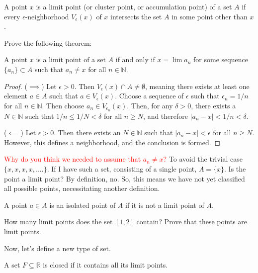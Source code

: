 \documentclass{ximera}
\begin{document}
\begin{definition}
    A point $x$ is a limit point (or cluster point, or accumulation point) of a set $A$ if every $\epsilon$-neighborhood $V_\epsilon(x)$ of $x$ intersects the set $A$ in some point other than $x$.  
\end{definition}
\begin{exercise}
    Prove the following theorem:
\begin{theorem}
    A point $x$ is a limit point of a set $A$ if and only if $x = \lim a_n$ for some sequence $\{a_n\}\subset A$ such that $a_n \neq x$ for all $n \in \mathbb{N}$.
\end{theorem}
\end{exercise}
\begin{proof}
    ($\implies$)  Let $\epsilon > 0$.  Then $V_\epsilon(x) \cap A \neq \emptyset$, meaning there exists at least one element $a \in A$ such that $a \in V_\epsilon(x)$.  Choose a sequence of $\epsilon$ such that $\epsilon_n = 1/n$ for all $n \in \mathbb{N}$.  Then choose $a_n \in V_{\epsilon_n}(x)$.  Then, for any $\delta > 0$, there exists a $N\in\mathbb{N}$ such that $1/n\leq 1/N < \delta$ for all $n\geq N$, and therefore $|a_n-x| < 1/n < \delta$.

    ($\impliedby$)  Let $\epsilon > 0$.  Then there exists an $N \in \mathbb{N}$ such that $|a_n-x| < \epsilon$ for all $n \geq N$.  However, this defines a neighborhood, and the conclusion is formed.
\end{proof}
    \textcolor{red}{Why do you think we needed to assume that $a_n \neq x$?}
To avoid the trivial case $\{x, x, x, x, ....\}$.  If I have such a set, consisting of a single point, $A = \{x\}$.  Is the point a limit point?  By definition, no.  So, this means we have not yet classified all possible points, necessitating another definition.

\begin{definition}
    A point $a \in  A$ is an isolated point of $A$ if it is not a limit point of $A$.
\end{definition}


    \begin{exercise}
        How many limit points does the set $[1,2]$ contain?  Prove that these points are limit points.
    \end{exercise} 


Now, let's define a new type of set.

\begin{definition}
    A set $F\subseteq\mathbb{R}$ is closed if it contains all its limit points.
\end{definition}
\end{document}
